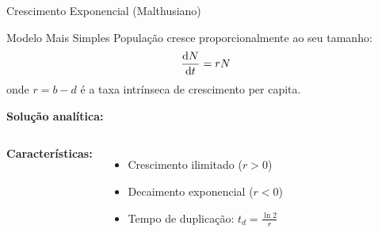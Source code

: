 \begin{frame}{Crescimento Exponencial (Malthusiano)}
\begin{block}{Modelo Mais Simples}
População cresce proporcionalmente ao seu tamanho:
\begin{equation*}
\frac{\mathrm{d} N}{\mathrm{d} t} = rN
\end{equation*}
onde $r = b - d$ é a taxa intrínseca de crescimento per capita.
\end{block}

\textbf{Solução analítica:}

\begin{columns}
\textbf{Características:}
\begin{itemize}
    \item Crescimento ilimitado ($r > 0$)
    \item Decaimento exponencial ($r < 0$)
    \item Tempo de duplicação: $t_d = \frac{\ln 2}{r}$
\end{itemize}

\begin{center}
\end{center}
\end{columns}
\end{frame}

